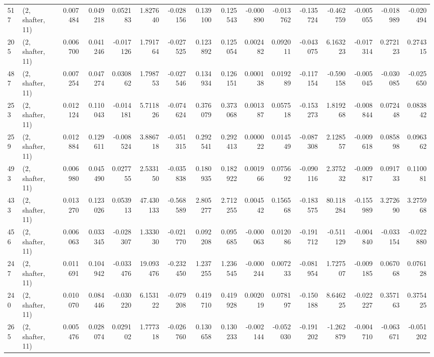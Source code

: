 \begin{tabular}{llrrrrrrrrrrrrrr}
517 &  (2, shafter, 11) &   0.007484 &  0.049218 &  0.052183 &    1.827640 & -0.028156 &   0.139100 &  0.125543 & -0.000890 & -0.013762 & -0.135724 &   -0.462759 & -0.005055 & -0.018989 & -0.020494 \\
205 &  (2, shafter, 11) &   0.006700 &  0.041246 & -0.017126 &    1.791764 & -0.027525 &   0.123892 &  0.125054 &  0.002482 &  0.092011 & -0.043075 &    6.163223 & -0.017314 &  0.272123 &  0.274315 \\
487 &  (2, shafter, 11) &   0.007254 &  0.047274 &  0.030862 &    1.798753 & -0.027546 &   0.134934 &  0.126151 &  0.000138 &  0.019289 & -0.117154 &   -0.590158 & -0.005045 & -0.030085 & -0.025650 \\
253 &  (2, shafter, 11) &   0.012124 &  0.110043 & -0.014181 &    5.711826 & -0.074624 &   0.376079 &  0.373068 &  0.001387 &  0.057518 & -0.153273 &    1.819268 & -0.008844 &  0.072448 &  0.083842 \\
259 &  (2, shafter, 11) &   0.012884 &  0.129611 & -0.008524 &    3.886718 & -0.051315 &   0.292541 &  0.292413 &  0.000022 &  0.014549 & -0.087308 &    2.128557 & -0.009618 &  0.085898 &  0.096362 \\
493 &  (2, shafter, 11) &   0.006980 &  0.045490 &  0.027755 &    2.533150 & -0.035838 &   0.180935 &  0.182922 &  0.001966 &  0.075692 & -0.090116 &    2.375232 & -0.009817 &  0.091733 &  0.110081 \\
433 &  (2, shafter, 11) &   0.013270 &  0.123026 &  0.053913 &   47.430133 & -0.568589 &   2.805277 &  2.712255 &  0.004542 &  0.156568 & -0.183575 &   80.118284 & -0.155989 &  3.272690 &  3.275968 \\
456 &  (2, shafter, 11) &   0.006063 &  0.033345 & -0.028307 &    1.333030 & -0.021770 &   0.092208 &  0.095685 & -0.000063 &  0.012086 & -0.191712 &   -0.511129 & -0.004840 & -0.033154 & -0.022880 \\
247 &  (2, shafter, 11) &   0.011691 &  0.104942 & -0.033476 &   19.093476 & -0.232450 &   1.237255 &  1.236545 & -0.000244 &  0.007233 & -0.081954 &    1.727507 & -0.009185 &  0.067068 &  0.076128 \\
240 &  (2, shafter, 11) &   0.010070 &  0.084446 & -0.030220 &    6.153122 & -0.079208 &   0.419710 &  0.419928 &  0.002019 &  0.078197 & -0.150188 &    8.646225 & -0.022227 &  0.357163 &  0.375425 \\
265 &  (2, shafter, 11) &   0.005476 &  0.028074 &  0.029102 &    1.777318 & -0.026760 &   0.130658 &  0.130233 & -0.002144 & -0.052030 & -0.191202 &   -1.262879 & -0.004710 & -0.063671 & -0.051202 \\

\end{tabular}
